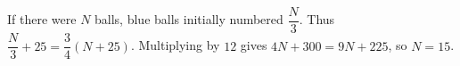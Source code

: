 If there were $N$ balls, blue balls initially numbered $\dfrac{N}{3}$. Thus $\dfrac{N}{3}+25=\dfrac{3}{4}(N+25)$. Multiplying by $12$ gives $4N+300=9N+225$, so $N=\boxed{15}$.
